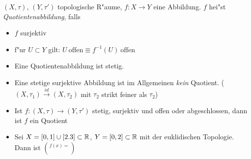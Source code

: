 \begin{dfn}
    $(X,\tau)$, $(Y, \tau')$ topologische R"aume, $f: X\to Y$ eine Abbildung. $f$
    hei"st \emph{Quotientenabbildung}, falls
    \begin{itemize}
        \item $f$ surjektiv
        \item f"ur $U \subset Y$ gilt: $U\ \mathrm{offen} \Equiv f^{-1}(U)\
            \mathrm{offen}$
    \end{itemize}

    \begin{bem}
        \begin{itemize}
            \item Eine Quotientenabbildung ist stetig.
            \item Eine stetige surjektive Abbildung ist im Allgemeinen
                \emph{kein} Quotient. ($(X, \tau_1) \overset{id} \to
                (X,\tau_2)$ mit $\tau_2$ strikt feiner als $\tau_2$)
        \end{itemize}
    \end{bem}

    \begin{bsps}
        \begin{itemize}
            \item Ist $f:(X,\tau)\to (Y,\tau')$ stetig, surjektiv und offen
                oder abgeschlossen, dann ist $f$ ein Quotient
            \item Sei $X=[0,1]\cup [2.3] \subset \mathbb{R}$, $Y=[0,2]\subset \mathbb{R}$ mit
                der euklidischen Topologie. Dann ist $f(x)=\choose$
        \end{itemize}
    \end{bsps}
\end{dfn}
